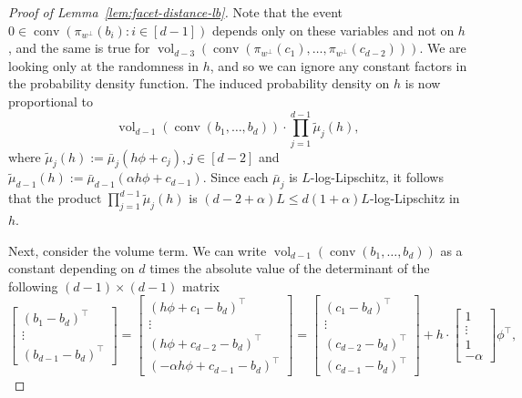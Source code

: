 \documentclass{theoretics}
\newcommand{\R}{\mathbb R}
\newcommand{\sfe}{\mathbb{S}^{d-1}}
\newcommand{\aff}{\operatorname{affhull}}
\newcommand{\conv}{\operatorname{conv}}
\newcommand{\vol}{\operatorname{vol}}
\begin{document}
\begin{proof}[Proof of Lemma~\ref{lem:facet-distance-lb}]
Note that the event $0 \in \conv(\pi_{w^\perp}(b_i) : i \in [d-1])$ depends only on these variables
and not on $h$, and the same is true for
$\vol_{d-3}(\conv(\pi_{w^\perp}(c_1),\dots,\pi_{w^\perp}(c_{d-2})))$.
We are looking only at the randomness in $h$,
and so we can ignore any constant factors in the probability density function.
The induced probability density on $h$ is now proportional to
\[
    \vol_{d-1}(\conv(b_1,\dots,b_d)) \cdot
    \prod_{j=1}^{d-1} \tilde{\mu}_j(h),
\]
where $\tilde{\mu}_j(h) := \bar{\mu}_j(h\phi + c_j), j \in [d-2]$ and
$\tilde{\mu}_{d-1}(h) := \bar{\mu}_{d-1}(\alpha h \phi + c_{d-1})$.
Since each $\bar{\mu}_j$ is $L$-log-Lipschitz,
it follows that the product $\prod_{j=1}^{d-1} \tilde{\mu}_j(h)$
is $(d-2 + \alpha)L \leq d(1 + \alpha)L$-log-Lipschitz
in $h$.

Next, consider the volume term.
We can write
    $\vol_{d-1}(\conv(b_1,\dots,b_d))$ as a constant depending on $d$ times
    the absolute value of the determinant of the following $(d-1)\times(d-1)$ matrix
    \[
        \begin{bmatrix}
            (b_1 - b_d)^\top \\
            \vdots \\
            (b_{d-1} - b_d)^\top
        \end{bmatrix}
        =
        \begin{bmatrix}
            (h\phi + c_1 - b_d)^\top \\
            \vdots \\
            (h\phi + c_{d-2} - b_d)^\top \\
            (- \alpha h\phi +  c_{d-1} - b_d)^\top 
        \end{bmatrix}
        =
        \begin{bmatrix}
            (c_1 - b_d)^\top \\
            \vdots \\
            (c_{d-2} - b_d)^\top \\
            (c_{d-1} - b_d)^\top
        \end{bmatrix} +
        h\cdot \begin{bmatrix} 1 \\ \vdots \\ 1 \\ -\alpha \end{bmatrix} \phi^\top,
    \]

\end{proof}
\end{document}
